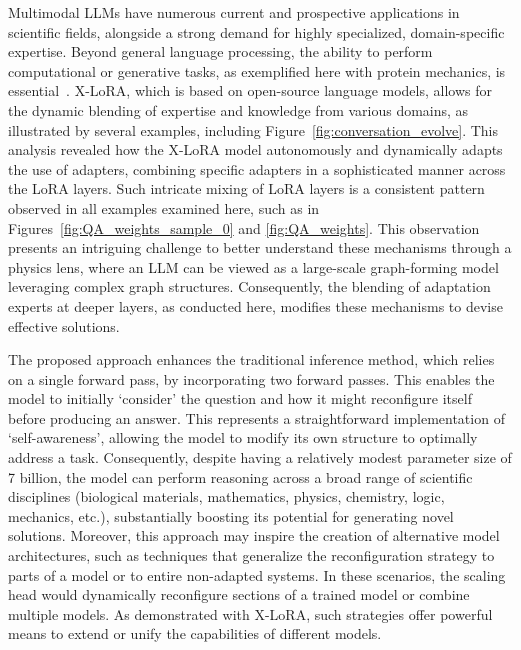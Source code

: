 Multimodal LLMs have numerous current and prospective applications in scientific fields, alongside a strong demand for highly specialized, domain-specific expertise. Beyond general language processing, the ability to perform computational or generative tasks, as exemplified here with protein mechanics, is essential~\cite{Luu2023BioinspiredLLM:Materials,Buehler2023MechGPTModalities,Buehler2023MeLMProblemsb}. X-LoRA, which is based on open-source language models, allows for the dynamic blending of expertise and knowledge from various domains, as illustrated by several examples, including Figure~\ref{fig:conversation_evolve}. This analysis revealed how the X-LoRA model autonomously and dynamically adapts the use of adapters, combining specific adapters in a sophisticated manner across the LoRA layers. Such intricate mixing of LoRA layers is a consistent pattern observed in all examples examined here, such as in Figures~\ref{fig:QA_weights_sample_0} and \ref{fig:QA_weights}. This observation presents an intriguing challenge to better understand these mechanisms through a physics lens, where an LLM can be viewed as a large-scale graph-forming model leveraging complex graph structures. Consequently, the blending of adaptation experts at deeper layers, as conducted here, modifies these mechanisms to devise effective solutions.

The proposed approach enhances the traditional inference method, which relies on a single forward pass, by incorporating two forward passes. This enables the model to initially ‘consider’ the question and how it might reconfigure itself before producing an answer. This represents a straightforward implementation of ‘self-awareness’, allowing the model to modify its own structure to optimally address a task. Consequently, despite having a relatively modest parameter size of 7 billion, the model can perform reasoning across a broad range of scientific disciplines (biological materials, mathematics, physics, chemistry, logic, mechanics, etc.), substantially boosting its potential for generating novel solutions. Moreover, this approach may inspire the creation of alternative model architectures, such as techniques that generalize the reconfiguration strategy to parts of a model or to entire non-adapted systems. In these scenarios, the scaling head would dynamically reconfigure sections of a trained model or combine multiple models. As demonstrated with X-LoRA, such strategies offer powerful means to extend or unify the capabilities of different models.

